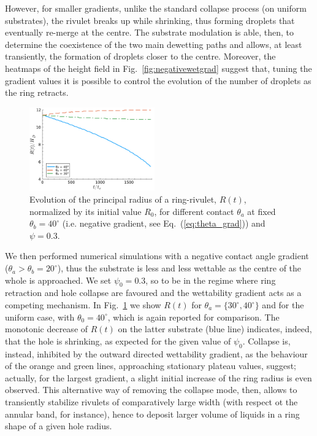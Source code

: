 \documentclass[twoside,twocolumn,9pt]{article}
\begin{document}
However, for smaller gradients, unlike the standard collapse process 
(on uniform substrates), the rivulet breaks up while shrinking, thus forming droplets that 
eventually re-merge at the centre. The substrate modulation is able, then, to determine the coexistence of the two main dewetting paths and allows, at least transiently, the formation of droplets closer to the centre. Moreover, the heatmaps of the height field in Fig.~\ref{fig:negativewetgrad} suggest that, tuning the gradient values it is possible to control the evolution of the number of droplets as the ring retracts.\\
\begin{figure}
    \centering
    \includegraphics[width=0.48\textwidth]{assets/radius_time_gradient_positive.pdf}
    \caption{Evolution of the principal radius of a ring-rivulet, $R(t)$, normalized by its initial value $R_0$, for different contact $\theta_a$ at fixed $\theta_b = 40^{\circ}$ 
    (i.e. negative gradient, see Eq.~(\ref{eq:theta_grad})) and $\psi = 0.3$.}
    \label{fig:positivewetgrad}
\end{figure}
We then performed numerical simulations with a negative contact angle gradient ($\theta_a > \theta_b = 20^{\circ}$), thus the substrate is less and less wettable as the centre of the whole is approached.
We set $\psi_0 = 0.3$, so to be in the regime where ring retraction and hole collapse are favoured and the wettability gradient acts as a competing mechanism.
In Fig.~\ref{fig:positivewetgrad} we show $R(t)$ for 
$\theta_a = \{ 30^{\circ}, 40^{\circ} \}$ and for the uniform case, with $\theta_0 = 40^{\circ}$, which is again reported for comparison.
The monotonic decrease of $R(t)$ on the latter substrate (blue line) indicates, indeed, that the hole is shrinking, as expected for the given value of $\psi_0$. 
Collapse is, instead, inhibited by the outward directed wettability gradient, as the behaviour of the orange and green lines, approaching stationary plateau values, suggest; actually, for the largest gradient, a slight initial increase of the ring radius is even observed. 
This alternative way of removing the collapse mode, then, allows to transiently stabilize rivulets
of comparatively large width (with respect ot the annular band, for instance), hence to deposit 
larger volume of liquids in a ring shape of a given hole radius. 
\end{document}
